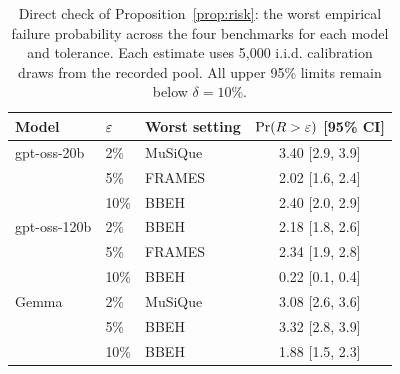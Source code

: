 \begin{table}[!t]
\centering
\small
\setlength{\tabcolsep}{4pt}
\begin{tabular}{@{}lllc@{}}
\toprule
Model & $\varepsilon$ & Worst setting & $\Pr(R>\varepsilon)$ [95\% CI] \\
\midrule
gpt-oss-20b & 2\% & MuSiQue & 3.40 [2.9, 3.9] \\
 & 5\% & FRAMES & 2.02 [1.6, 2.4] \\
 & 10\% & BBEH & 2.40 [2.0, 2.9] \\
\midrule
gpt-oss-120b & 2\% & BBEH & 2.18 [1.8, 2.6] \\
 & 5\% & FRAMES & 2.34 [1.9, 2.8] \\
 & 10\% & BBEH & 0.22 [0.1, 0.4] \\
\midrule
Gemma & 2\% & MuSiQue & 3.08 [2.6, 3.6] \\
 & 5\% & BBEH & 3.32 [2.8, 3.9] \\
 & 10\% & BBEH & 1.88 [1.5, 2.3] \\
\bottomrule
\end{tabular}
\caption{Direct check of Proposition~\ref{prop:risk}: the worst empirical failure probability
across the four benchmarks for each model and tolerance. Each estimate uses 5{,}000 i.i.d. calibration
draws from the recorded pool. All upper 95\% limits remain below $\delta=10\%$.}
\label{tab:iid}
\end{table}
